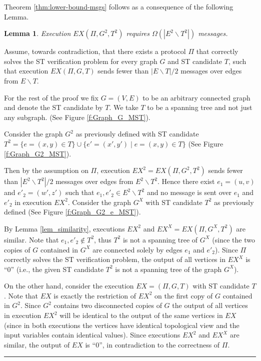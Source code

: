 \documentclass[11pt,letter]{article}
\def\sminus{\smallsetminus}
\newtheorem{lemma}[theorem]{Lemma}
\newcommand{\qed}{\rule{7pt}{7pt}}
\newenvironment{proof}{\noindent{\bf Proof}\hspace*{1em}}{\qed\bigskip}
\begin{document}
Theorem \ref{thm:lower-bound-msgs} follows as a consequence of the following 
Lemma.
\begin{lemma}
\label{clm_msg_lb}
Execution 
$EX(\Pi, G^2,T^2)$ requires $\Omega (|E^2\smallsetminus T^2|)$ messages.
\end{lemma}

\begin{proof}
Assume, towards contradiction, that there exists a protocol $\Pi$ 
that correctly solves the ST verification problem for every graph $G$ and 
ST candidate $T$, such that execution $EX(\Pi, G, T)$ sends fewer than
$|E\sminus T|/2$ messages over edges from $E \sminus T$.

For the rest of the proof we fix $G=(V,E)$ to be an arbitrary connected graph 
and denote the ST candidate by $T$.
We take $T$ to be a spanning tree and not just any subgraph.
(See Figure \ref{f:Graph_G_MST}).
 
Consider the graph $G^2$ as previously defined with ST candidate 
$T^2=\{e=(x,y)\in T\}\cup \{e'=(x',y') \mid e=(x,y)\in T\}$ 
(See Figure \ref{f:Graph_G2_MST}).  

Then by the assumption on $\Pi$, 
execution $EX^2=EX(\Pi, G^2, T^2)$ sends fewer than 
$|E^2\sminus T^2|/2$ messages over edges from $E^2\sminus T^2$. 
Hence there exist $e_1=(u,v)$ and $e'_2=(w',z')$ such that 
$e_1,e'_2\in E^2\sminus T^2$ and no message is sent over $e_1$ and $e'_2$ 
in execution $EX^2$. Consider the graph $G^X$ with ST candidate $T^2$ 
as previously defined (See Figure \ref{f:Graph_G2_e_MST}).

By Lemma \ref{lem_similarity}, executions $EX^2$ and $EX^X=EX(\Pi, G^X, T^2)$ 
are similar. Note that $e_1,e'_2 \notin T^2$, 
thus $T^2$ is not a spanning tree of $G^X$ (since the two copies of $G$   
contained in $G^X$ are connected solely by edges $e_1$ and $e'_2$). 
Since $\Pi$  correctly solves the ST verification problem, the output 
of all vertices in $EX^X$ is ``0'' (i.e., the given ST candidate $T^2$ is not 
a spanning tree of the graph $G^X$). 

On the other hand, consider the execution 
$EX=(\Pi,G, T)$ with ST candidate $T$. Note that $EX$ is exactly the 
restriction of $EX^2$ on the first copy of $G$ contained in $G^2$. 
Since $G^2$ contains two disconnected copies of $G$ the output of all vertices 
in execution $EX^2$ will be identical to the output of the same vertices 
in $EX$ (since in both executions the vertices have identical topological view 
and the input variables contain identical values). 
Since executions $EX^2$ and $EX^X$ are similar, the output of $EX$ is ``0'', 
in contradiction to the correctness of $\Pi$.
\end{proof}
\end{document}
